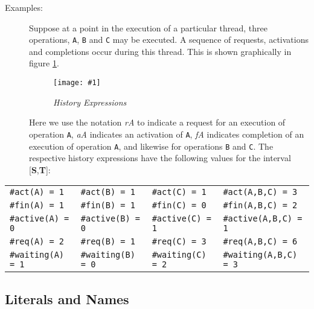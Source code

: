 \documentclass[\pformat,12pt]{article}
\newcommand{\insertfig}[4]{ %
\begin{figure}[H]
\begin{center}
\texttt{[image: \#1]} 
\end{center}
\caption{{\em #3}} #4
\end{figure}
}
\begin{document}
\begin{description}
\item[Examples:]Suppose at a point in the execution of a particular
thread, three operations, \texttt{A}, \texttt{B} and \texttt{C} may be
executed. A sequence of requests, activations and completions occur
during this thread. This is shown graphically in figure \ref{historyfig}.

\insertfig{history}{14cm}{History Expressions}{\label{historyfig}}

Here we use the notation \textit{rA} to indicate a request for an
execution of operation \texttt{A}, \textit{aA} indicates an activation
of \texttt{A}, \textit{fA} indicates completion of an execution of
operation \texttt{A}, and likewise for operations \texttt{B} and
\texttt{C}. The respective history expressions have the following
values for the interval [\textbf{S},\textbf{T}]:
\end{description}

\begin{center}\small
\begin{tabular}{llll}
\texttt{\#act(A) = 1} & \texttt{\#act(B) = 1} & \texttt{\#act(C) = 1}
& \texttt{\#act(A,B,C) = 3}\\
\texttt{\#fin(A) = 1} & \texttt{\#fin(B) = 1} & \texttt{\#fin(C) = 0}
& \texttt{\#fin(A,B,C) = 2}\\
\texttt{\#active(A) = 0} & \texttt{\#active(B) = 0} & 
\texttt{\#active(C) = 1} & \texttt{\#active(A,B,C) = 1}\\
\texttt{\#req(A) = 2} & \texttt{\#req(B) = 1} & \texttt{\#req(C) = 3}
& \texttt{\#req(A,B,C) = 6}\\
\texttt{\#waiting(A) = 1} & \texttt{\#waiting(B) = 0} & 
\texttt{\#waiting(C) = 2} & \texttt{\#waiting(A,B,C) = 3}\\
\end{tabular}
\end{center}




\subsection{Literals and Names}
\end{document}
